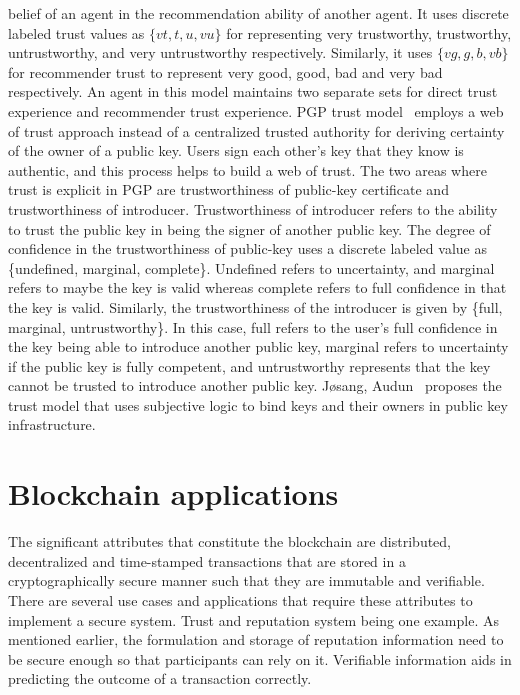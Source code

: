 belief of an agent in the recommendation ability of another agent. It uses
discrete labeled trust values as $\{vt, t, u, vu\}$ for representing very
trustworthy, trustworthy, untrustworthy, and very untrustworthy respectively.
Similarly, it uses $\{vg, g, b, vb\}$ for recommender trust to represent very
good, good, bad and very bad respectively. An agent in this model maintains two
separate sets for direct trust experience and recommender trust experience. PGP
trust model~\cite{abdul1997pgp} employs a web of trust approach instead of a
centralized trusted authority for deriving certainty of the owner of a public
key. Users sign each other's key that they know is authentic, and this process
helps to build a web of trust. The two areas where trust is explicit in PGP are
trustworthiness of public-key certificate and trustworthiness of introducer.
Trustworthiness of introducer refers to the ability to trust the public key in
being the signer of another public key. The degree of confidence in the
trustworthiness of public-key uses a discrete labeled value as \{undefined,
marginal, complete\}. Undefined refers to uncertainty, and marginal refers to
maybe the key is valid whereas complete refers to full confidence in that the
key is valid. Similarly, the trustworthiness of the introducer is given by
\{full, marginal, untrustworthy\}. In this case, full refers to the user's full
confidence in the key being able to introduce another public key, marginal
refers to uncertainty if the public key is fully competent, and untrustworthy
represents that the key cannot be trusted to introduce another public key.
Jøsang, Audun~\cite{josang1999algebra} proposes the trust model that uses
subjective logic to bind keys and their owners in public key infrastructure.  

\section{Blockchain applications}
The significant attributes that constitute the blockchain are distributed,
decentralized and time-stamped transactions that are stored in a
cryptographically secure manner such that they are immutable and verifiable.
There are several use cases and applications that require these attributes to
implement a secure system. Trust and reputation system being one example. As
mentioned earlier, the formulation and storage of reputation information need
to be secure enough so that participants can rely on it. Verifiable information
aids in predicting the outcome of a transaction correctly. \par 

